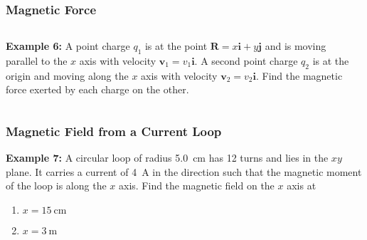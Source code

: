 \documentclass[12pt,aspectratio=169]{beamer}
\newcommand{\mb}[1]{\mathbf{#1}}
\begin{document}
\begin{frame}
  \frametitle{Magnetic Force \footnotemark}
  \begin{columns}
    \textbf{Example 6:} A point charge $q_1$ is at the point
    $\mb{R}=x\mb{i}+y\mb{j}$ and is moving parallel to the $x$ axis with
    velocity $\mb{v}_1=v_1\mb{i}$. A second point charge $q_2$ is at the origin
    and moving along the $x$ axis with velocity $\mb{v}_2=v_2\mb{i}$. Find the
    magnetic force exerted by each charge on the other.
    
    \begin{center}
    \end{center}
  \end{columns}

\end{frame}


\begin{frame}
  \frametitle{Magnetic Field from a Current Loop \footnotemark}
  \textbf{Example 7:} A circular loop of radius \SI{5.0}{\centi\metre} has
  \num{12} turns and lies in the $xy$ plane. It carries a current of
  \SI{4}{\ampere} in the direction such that the magnetic moment of the loop is
  along the $x$ axis. Find the magnetic field on the $x$ axis at 
  \begin{enumerate}
  \item $x=\SI{15}{\centi\metre}$
  \item $x=\SI{3}{\metre}$
  \end{enumerate}

\end{frame}
\end{document}
